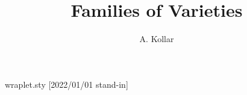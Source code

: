\begin{filecontents*}{wraplet.sty}
[2022/01/01 stand-in]
\def\displayaddresses{}
\let\@pigaaddress\address
\def\wr@address#1{\g@addto@macro{\displayaddresses}{\par\noindent#1}\@pigaaddress{#1}}\let\address\wr@address
\let\orgemail=\email
\renewcommand{\email}[1]{\orgemail{\href{mailto:#1}{#1}}}
\end{filecontents*}
\documentclass{amsart}
\usepackage{hyperref}
\usepackage{wraplet}

\title{Families of Varieties}
\author{A. Kollar}
\address{Princeton University}
\maketitle
Body.

\displayaddresses

